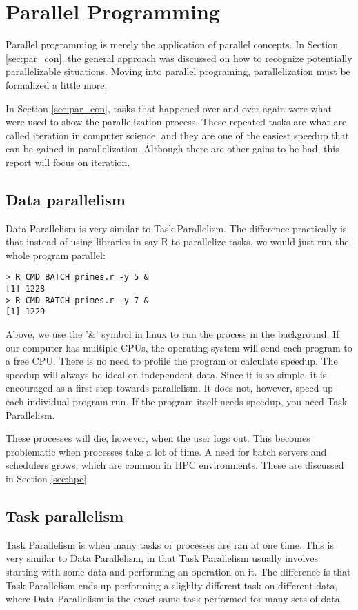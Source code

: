 \section{Parallel Programming}
Parallel programming is merely the application of parallel concepts. In Section \ref{sec:par_con}, the general
approach was discussed on how to recognize potentially parallelizable situations. Moving into parallel
programing, parallelization must be formalized a little more.

In Section \ref{sec:par_con}, tasks that happened over and over again were what were used to show the 
parallelization process. These repeated tasks are what are called iteration in computer science, and they are
one of the easiest speedup that can be gained in parallelization. Although there are other gains to be had,
this report will focus on iteration. 

\subsection{Data parallelism}
Data Parallelism is very similar to Task Parallelism. The difference practically is that instead of using libraries
in say R to parallelize tasks, we would just run the whole program parallel:
\scriptsize
\begin{lstlisting}
> R CMD BATCH primes.r -y 5 &
[1] 1228
> R CMD BATCH primes.r -y 7 &
[1] 1229
\end{lstlisting}
\normalsize

Above, we use the '\&' symbol in linux to run the process in the background. If our computer has multiple 
CPUs, the operating system will send each program to a free CPU. There is no need to profile the program
or calculate speedup. The speedup will always be ideal on independent data. Since it is so simple, it is 
encouraged as a first step towards parallelism. It does not, however, speed up each individual program run. 
If the program itself needs speedup, you need Task Parallelism.

These processes will die, however, when the user logs out. This becomes problematic when processes take a 
lot of time. A need for batch servers and schedulers grows, which are common in \gls{HPC} environments. 
These are discussed in Section \ref{sec:hpc}.

\subsection{Task parallelism}
Task Parallelism is when many tasks or processes are ran at one time. This is very similar to Data Parallelism,
in that Task Parallelism usually involves starting with some data and performing an operation on it. The
difference is that Task Parallelism ends up performing a slighlty different task on different data, where
Data Parallelism is the exact same task performed for many sets of data.

